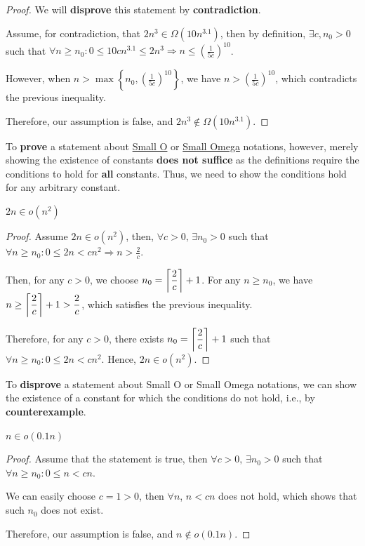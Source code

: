 \begin{proof}
    We will \textbf{disprove} this statement by \textbf{contradiction}.

    Assume, for contradiction, that $2n^{3} \in \Omega(10n^{3.1})$, then by definition, $\exists c, n_0 > 0$ such that $\displaystyle \forall n\geq n_0 : 0 \leq 10cn^{3.1} \leq 2n^{3} \Rightarrow n\leq \left(\frac{1}{5c}\right)^{10}$.

    However, when $\displaystyle n > \max\left\{n_0, \left(\frac{1}{5c}\right)^{10}\right\}$, we have $n > \left(\frac{1}{5c}\right)^{10}$, which contradicts the previous inequality.

    Therefore, our assumption is false, and $2n^{3} \notin \Omega(10n^{3.1})$.
\end{proof}

To \textbf{prove} a statement about \hyperref[def:small-o-notation]{Small O} or \hyperref[def:small-omega-notation]{Small Omega} notations, however, merely showing the existence of constants \textbf{does not suffice} as the definitions require the conditions to hold for \textbf{all} constants.
Thus, we need to show the conditions hold for any arbitrary constant.

\begin{proposition}
    $2n \in o(n^2)$
\end{proposition}
\begin{proof}
    Assume $2n \in o(n^2)$, then, $\forall c > 0,\, \exists n_0 > 0$ such that $\displaystyle\forall n\geq n_0 : 0 \leq 2n < cn^2 \Rightarrow n > \frac{2}{c}$.

    Then, for any $c>0$, we choose $\displaystyle n_0 = \ceil*{\frac{2}{c}}+1$.
    For any $n\geq n_0$, we have $\displaystyle n\geq\ceil*{\frac{2}{c}}+1 > \frac{2}{c}$, which satisfies the previous inequality.

    Therefore, for any $c>0$, there exists $\displaystyle n_0 = \ceil*{\frac{2}{c}}+1$ such that $\displaystyle\forall n\geq n_0 : 0 \leq 2n < cn^2$.
    Hence, $2n \in o(n^2)$.
\end{proof}

To \textbf{disprove} a statement about Small O or Small Omega notations, we can show the existence of a constant for which the conditions do not hold, i.e., by \textbf{counterexample}.

\begin{proposition}
    $n\in o(0.1n)$
\end{proposition}
\begin{proof}
    Assume that the statement is true, then $\forall c>0,\, \exists n_0 > 0$ such that $\forall n\geq n_0 : 0 \leq n < cn$.

    We can easily choose $c=1>0$, then $\forall n$, $n < cn$ does not hold, which shows that such $n_0$ does not exist.

    Therefore, our assumption is false, and $n \notin o(0.1n)$.
\end{proof}

